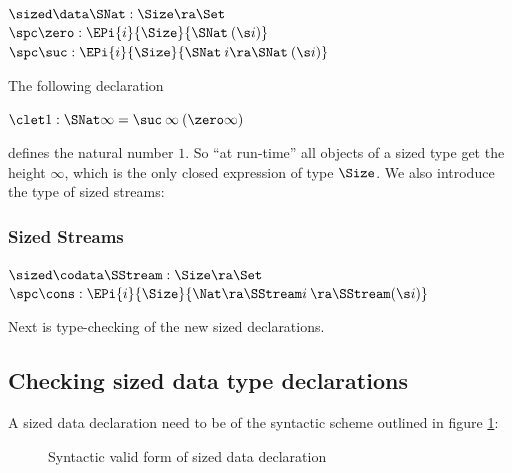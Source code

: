 \begin{bsp}
$\sized \data \SNat : \Size \ra \Set $ \\
$\spc \zero : \EPi{i}{\Size}{ \SNat \: (\s i)} $\\
$\spc \suc : \EPi{i}{\Size}{ \SNat \: i \ra \SNat \: (\s i)} $
\end{bsp}

\noindent The following declaration
\begin{bsp}
$\clet 1 : \SNat \infty = \suc \: \infty \: (\zero \infty)$ 
\end{bsp}
\noindent defines the natural number $1$. So ``at run-time'' all objects of a sized type get the height $\infty$,
which is the only closed expression of type $\Size$. We also introduce the type of sized streams:
\subsubsection{Sized Streams}
\begin{bsp}
$\sized \codata \SStream : \Size \ra \Set $ \\
$\spc \cons : \EPi{i}{\Size}{\Nat \ra \SStream i \: \ra \SStream (\s i) } $
\end{bsp}
Next is type-checking of the new sized declarations. 
\subsection{Checking sized data type declarations}

A sized data declaration need to be of the syntactic scheme outlined in figure \ref{ssyn}:

\begin{figure}[htp]
\caption{Syntactic valid form of sized data declaration}
\label{ssyn}
\end{figure}

